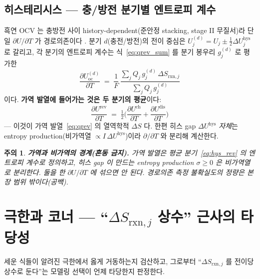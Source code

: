 \documentclass[11pt,a4paper]{article}
\newtheorem*{warnbox}{주의}
\newcommand{\rxn}{\mathrm{rxn}}
\newcommand{\oc}{\mathrm{oc}}
\begin{document}
\subsection{히스테리시스 — 충/방전 분기별 엔트로피 계수}
흑연 OCV 는 충방전 사이 history-dependent(준안정 stacking, stage II 무질서)라 단일 $\partial U/\partial T$
가 경로의존이다 \cite{hysteresis2018}. 분기 $d$(충전/방전)의 전이 중심은
$U_j^{(d)}=U_j\pm\tfrac12\Delta U_j^\mathrm{hys}$ 로 갈리고, 각 분기의 엔트로피 계수는 식~\eqref{eq:qrev_sum}
를 분기 봉우리 $g_j^{(d)}$ 로 평가한
\begin{equation}
\frac{\partial U_\oc^{(d)}}{\partial T}
   \;=\;\frac{1}{F}\,\frac{\sum_j Q_j\,g_j^{(d)}\,\Delta S_{\rxn,j}}{\sum_j Q_j\,g_j^{(d)}}
\label{eq:hys_branch}
\end{equation}
이다. \textbf{가역 발열에 들어가는 것은 두 분기의 평균}이다:
\begin{equation}
\boxed{\;\frac{\partial U^\mathrm{rev}}{\partial T}
   \;=\;\tfrac12\Big(\frac{\partial U^\mathrm{ch}}{\partial T}+\frac{\partial U^\mathrm{dis}}{\partial T}\Big)\;}
\label{eq:hys_rev}
\end{equation}
— 이것이 가역 발열~\eqref{eq:qrev} 의 열역학적 $\Delta S$ 다. 한편 히스 gap $\Delta U^\mathrm{hys}$
\emph{자체}는 entropy production(비가역열 $\propto I\,\Delta U^\mathrm{hys}$)이라 $\partial/\partial T$
와 분리해 계산한다.

\begin{warnbox}
\textbf{가역과 비가역의 경계(혼동 금지).} 가역 발열은 \emph{평균 분기}~\eqref{eq:hys_rev} 의 엔트로피
계수로 정의하고, 히스 gap 이 만드는 entropy production $\sigma\ge0$ 은 비가역열로 분리한다. 둘을
한 $\partial U/\partial T$ 에 섞으면 안 된다. 경로의존 측정 불확실도의 정량은 본 장 범위 밖이다(공백).
\end{warnbox}

\section{극한과 코너 — ``$\Delta S_{\rxn,j}$ 상수'' 근사의 타당성}\label{sec:limits}
세운 식들이 알려진 극한에서 옳게 거동하는지 검산하고, 그로부터 ``$\Delta S_{\rxn,j}$ 를 전이당 상수로
둔다''는 모델링 선택이 언제 타당한지 판정한다.
\end{document}
